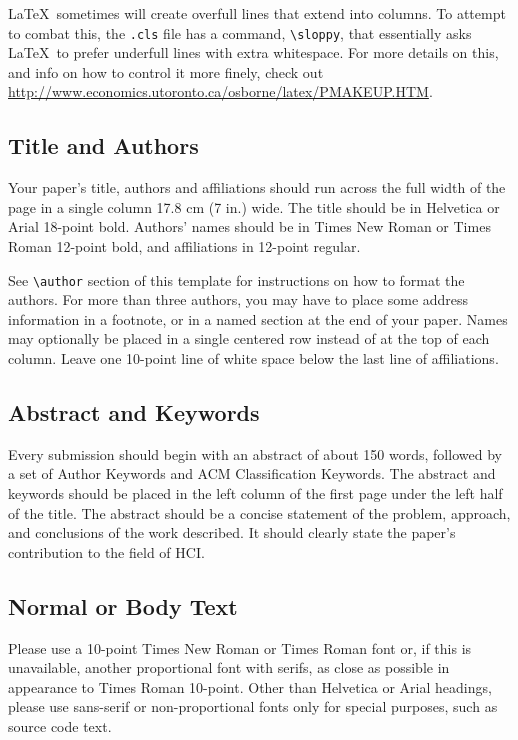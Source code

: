 \documentclass{sigchi}
\begin{document}
\LaTeX\ sometimes will create overfull lines that extend into columns.
To attempt to combat this, the \texttt{.cls} file has a command,
\texttt{{\textbackslash}sloppy}, that essentially asks \LaTeX\ to
prefer underfull lines with extra whitespace.  For more details on
this, and info on how to control it more finely, check out
{\url{http://www.economics.utoronto.ca/osborne/latex/PMAKEUP.HTM}}.

\subsection{Title and Authors}

Your paper's title, authors and affiliations should run across the
full width of the page in a single column 17.8 cm (7 in.) wide.  The
title should be in Helvetica or Arial 18-point bold.  Authors' names
should be in Times New Roman or Times Roman 12-point bold, and
affiliations in 12-point regular.  

See \texttt{{\textbackslash}author} section of this template for
instructions on how to format the authors. For more than three
authors, you may have to place some address information in a footnote,
or in a named section at the end of your paper. Names may optionally
be placed in a single centered row instead of at the top of each
column. Leave one 10-point line of white space below the last line of
affiliations.

\subsection{Abstract and Keywords}

Every submission should begin with an abstract of about 150 words,
followed by a set of Author Keywords and ACM Classification
Keywords. The abstract and keywords should be placed in the left
column of the first page under the left half of the title. The
abstract should be a concise statement of the problem, approach, and
conclusions of the work described. It should clearly state the paper's
contribution to the field of HCI\@.

\subsection{Normal or Body Text}

Please use a 10-point Times New Roman or Times Roman font or, if this
is unavailable, another proportional font with serifs, as close as
possible in appearance to Times Roman 10-point. Other than Helvetica
or Arial headings, please use sans-serif or non-proportional fonts
only for special purposes, such as source code text.
\end{document}
